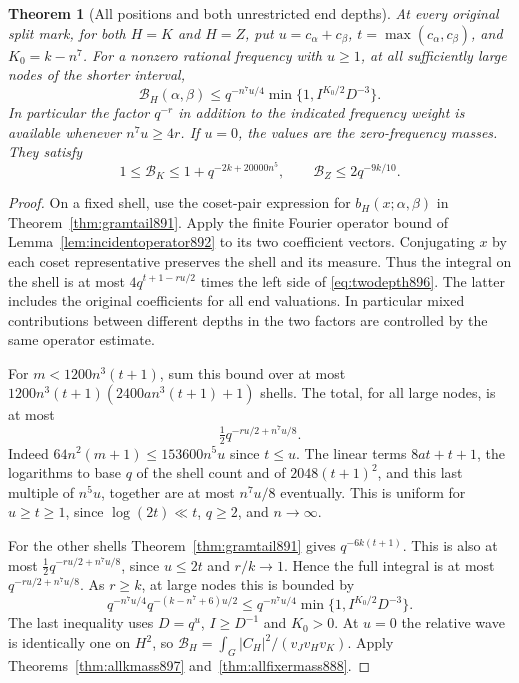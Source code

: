 \documentclass[a4paper,11pt]{article}
\newtheorem{theorem}[proposition]{Theorem}
\theoremstyle{definition}
\theoremstyle{remark}
\numberwithin{equation}{section}
\begin{document}
\begin{theorem}[All positions and both unrestricted end depths]
\leavevmode\label{thm:fullfirst898}
At every original split mark, for both \(H=K\) and \(H=Z\), put
\(u=c_\alpha+c_\beta\), \(t=\max(c_\alpha,c_\beta)\),
and \(K_0=k-n^7\). For a nonzero rational frequency with \(u\ge1\),
at all sufficiently large nodes of the shorter interval,
\begin{equation}
 \mathcal B_H(\alpha,\beta)
       \le q^{-n^7u/4}\min\{1,I^{K_0/2}D^{-3}\}.
 \label{eq:fullfirst898}
\end{equation}
In particular the factor \(q^{-r}\) in addition to the indicated
frequency weight is available whenever \(n^7u\ge4r\).
If \(u=0\), the values are the zero-frequency masses. They satisfy
\[
 1\le\mathcal B_K\le1+q^{-2k+20000n^5},\qquad
             \mathcal B_Z\le2q^{-9k/10}.
\]
\end{theorem}
\begin{proof}
On a fixed shell, use the coset-pair expression for
\(b_H(x;\alpha,\beta)\) in Theorem~\ref{thm:gramtail891}.
Apply the finite Fourier operator bound of
Lemma~\ref{lem:incidentoperator892} to its two coefficient
vectors. Conjugating \(x\) by each coset representative preserves
the shell and its measure. Thus the integral on the shell is
at most \(4q^{t+1-ru/2}\) times the left side of
\eqref{eq:twodepth896}. The latter includes the original
coefficients for all end valuations. In particular mixed
contributions between different depths in the two factors
are controlled by the same operator estimate.

For \(m<1200n^3(t+1)\), sum this bound over at most
\(1200n^3(t+1)(2400an^3(t+1)+1)\) shells. The total, for all large
nodes, is at most
\[
                       \tfrac12 q^{-ru/2+n^7u/8}.
\]
Indeed \(64n^2(m+1)\le153600 n^5u\) since \(t\le u\).
The linear terms \(8at+t+1\), the logarithms to base \(q\)
of the shell count and of \(2048(t+1)^2\), and this last
multiple of \(n^5u\), together are at most \(n^7u/8\)
eventually. This is uniform for \(u\ge t\ge1\), since
\(\log(2t)\ll t\), \(q\ge2\), and \(n\to\infty\).

For the other shells Theorem~\ref{thm:gramtail891} gives
\(q^{-6k(t+1)}\). This is also at most
\(\tfrac12 q^{-ru/2+n^7u/8}\), since \(u\le2t\) and \(r/k\to1\).
Hence the full integral is at most \(q^{-ru/2+n^7u/8}\).
As \(r\ge k\), at large nodes this is bounded by
\[
 q^{-n^7u/4}q^{-(k-n^7+6)u/2}
       \le q^{-n^7u/4}\min\{1,I^{K_0/2}D^{-3}\}.
\]
The last inequality uses \(D=q^u\), \(I\ge D^{-1}\) and \(K_0>0\).
At \(u=0\) the relative wave is identically one on \(H^2\), so
\(\mathcal B_H=\int_G|C_H|^2/(v_Jv_Hv_K)\). Apply
Theorems~\ref{thm:allkmass897} and~\ref{thm:allfixermass888}.
\end{proof}
\end{document}
